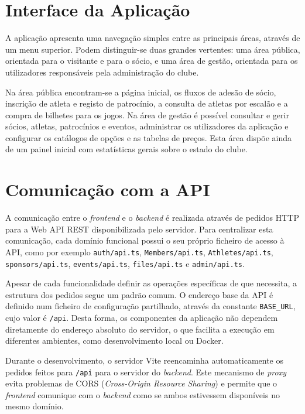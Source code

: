 \section{Interface da Aplicação}

A aplicação apresenta uma navegação simples entre as principais áreas, através 
de um menu superior. Podem distinguir-se duas grandes vertentes: uma área 
pública, orientada para o visitante e para o sócio, e uma área de gestão, 
orientada para os utilizadores responsáveis pela administração do clube.

Na área pública encontram-se a página inicial, os fluxos de adesão de sócio, 
inscrição de atleta e registo de patrocínio, a consulta de atletas por escalão 
e a compra de bilhetes para os jogos. Na área de gestão é possível consultar e 
gerir sócios, atletas, patrocínios e eventos, administrar os utilizadores da 
aplicação e configurar os catálogos de opções e as tabelas de preços. Esta 
área dispõe ainda de um painel inicial com estatísticas gerais sobre o estado 
do clube.

\section{Comunicação com a API}

A comunicação entre o \textit{frontend} e o \textit{backend} é realizada através
de pedidos HTTP para a Web API REST disponibilizada pelo servidor. Para
centralizar esta comunicação, cada domínio funcional possui o seu próprio
ficheiro de acesso à API, como por exemplo \texttt{auth/api.ts},
\texttt{Members/api.ts}, \texttt{Athletes/api.ts}, \texttt{sponsors/api.ts},
\texttt{events/api.ts}, \texttt{files/api.ts} e \texttt{admin/api.ts}.

Apesar de cada funcionalidade definir as operações específicas de que necessita,
a estrutura dos pedidos segue um padrão comum. O endereço base da API é definido
num ficheiro de configuração partilhado, através da constante \texttt{BASE\_URL},
cujo valor é \texttt{/api}. Desta forma, os componentes da aplicação não
dependem diretamente do endereço absoluto do servidor, o que facilita a execução
em diferentes ambientes, como desenvolvimento local ou Docker.

Durante o desenvolvimento, o servidor Vite reencaminha automaticamente os
pedidos feitos para \texttt{/api} para o servidor do \textit{backend}. Este
mecanismo de \textit{proxy} evita problemas de CORS (\textit{Cross-Origin
Resource Sharing}) e permite que o \textit{frontend} comunique com o
\textit{backend} como se ambos estivessem disponíveis no mesmo domínio.

